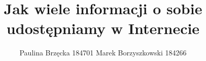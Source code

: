 \title{Jak wiele informacji o sobie udostępniamy w Internecie}
\author{Paulina Brzęcka 184701 Marek Borzyszkowski 184266}
\maketitle